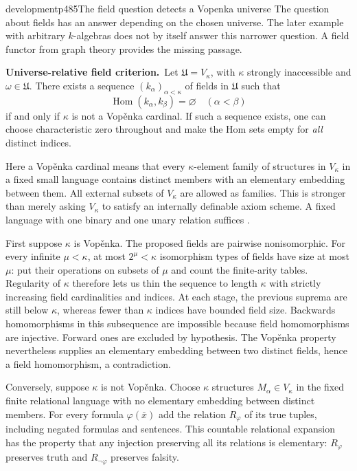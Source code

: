 \begin{dcomment}{development}{p485}{The field question detects a Vopenka universe}
The question about fields has an answer depending on the chosen universe. The later example with arbitrary $k$-algebras does not by itself answer this narrower question. A field functor from graph theory provides the missing passage.

\textbf{Universe-relative field criterion.}\ours\
Let $\mathfrak U=V_\kappa$, with $\kappa$ strongly inaccessible and $\omega\in\mathfrak U$. There exists a sequence $(k_\alpha)_{\alpha<\kappa}$ of fields in $\mathfrak U$ such that
\[
\operatorname{Hom}(k_\alpha,k_\beta)=\varnothing\quad(\alpha<\beta)
\]
if and only if $\kappa$ is not a Vop\v{e}nka cardinal. If such a sequence exists, one can choose characteristic zero throughout and make the Hom sets empty for \emph{all} distinct indices.

Here a Vop\v{e}nka cardinal means that every $\kappa$-element family of structures in $V_\kappa$ in a fixed small language contains distinct members with an elementary embedding between them. All external subsets of $V_\kappa$ are allowed as families. This is stronger than merely asking $V_\kappa$ to satisfy an internally definable axiom scheme. A fixed language with one binary and one unary relation suffices \citep[Definitions~1--3]{BrookeTaylor2011Vopenka}.

First suppose $\kappa$ is Vop\v{e}nka. The proposed fields are pairwise nonisomorphic. For every infinite $\mu<\kappa$, at most $2^\mu<\kappa$ isomorphism types of fields have size at most $\mu$: put their operations on subsets of $\mu$ and count the finite-arity tables. Regularity of $\kappa$ therefore lets us thin the sequence to length $\kappa$ with strictly increasing field cardinalities and indices. At each stage, the previous suprema are still below $\kappa$, whereas fewer than $\kappa$ indices have bounded field size. Backwards homomorphisms in this subsequence are impossible because field homomorphisms are injective. Forward ones are excluded by hypothesis. The Vop\v{e}nka property nevertheless supplies an elementary embedding between two distinct fields, hence a field homomorphism, a contradiction.

Conversely, suppose $\kappa$ is not Vop\v{e}nka. Choose $\kappa$ structures $M_\alpha\in V_\kappa$ in the fixed finite relational language with no elementary embedding between distinct members. For every formula $\varphi(\bar x)$ add the relation $R_\varphi$ of its true tuples, including negated formulas and sentences. This countable relational expansion has the property that any injection preserving all its relations is elementary: $R_\varphi$ preserves truth and $R_{\neg\varphi}$ preserves falsity.


\end{dcomment}
